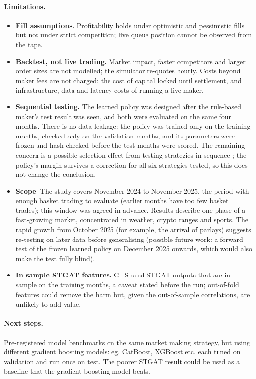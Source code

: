 \documentclass[11pt,a4paper]{article}
\begin{document}
\paragraph{Limitations.}
\begin{itemize}
  \item \textbf{Fill assumptions.} Profitability holds under optimistic and pessimistic fills but not under strict
    competition; live queue position cannot be observed from the tape.
  \item \textbf{Backtest, not live trading.} Market impact, faster competitors and larger order sizes are not
    modelled; the simulator re-quotes hourly. Costs beyond maker fees are not charged: the cost of capital locked
    until settlement, and infrastructure, data and latency costs of running a live maker.
  \item \textbf{Sequential testing.} The learned policy was designed after the rule-based maker's test result was
    seen, and both were evaluated on the same four months. There is no data leakage: the policy was trained only on
    the training months, checked only on the validation months, and its parameters were frozen and hash-checked
    before the test months were scored. The remaining concern is a possible selection effect from testing
    strategies in sequence \cite{white2000, bailey2014}; the policy's margin survives a correction for all six
    strategies tested, so this does not change the conclusion.
  \item \textbf{Scope.} The study covers November 2024 to November 2025, the period with enough basket trading to
    evaluate (earlier months have too few basket trades); this window was agreed in advance. Results describe one
    phase of a fast-growing market, concentrated in weather, crypto ranges and sports. The rapid growth from October
    2025 (for example, the arrival of parlays) suggests re-testing on later data before generalising (possible future
    work: a forward test of the frozen learned policy on December 2025 onwards, which would also make the test fully
    blind).
  \item \textbf{In-sample STGAT features.} G+S used STGAT outputs that are in-sample on the training months, a caveat
    stated before the run; out-of-fold features could remove the harm but, given the out-of-sample correlations,
    are unlikely to add value.
\end{itemize}

\paragraph{Next steps.} Pre-registered model benchmarks on the same market making strategy, but using different gradient boosting models: eg. CatBoost, XGBoost etc. each tuned on validation and run once on test. The poorer STGAT result could be used as a baseline that the gradient boosting model beats. 
\end{document}
